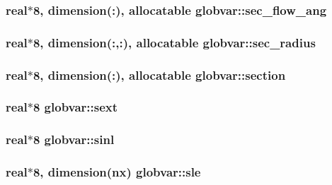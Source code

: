 \subsubsection[{sec\+\_\+flow\+\_\+ang}]{\setlength{\rightskip}{0pt plus 5cm}real$\ast$8, dimension(\+:), allocatable globvar\+::sec\+\_\+flow\+\_\+ang}\label{namespaceglobvar_a208ad9b136524be1d4393b67f071b5eb}
\hypertarget{namespaceglobvar_aca37141a129c261c28872a486944fece}{}
\subsubsection[{sec\+\_\+radius}]{\setlength{\rightskip}{0pt plus 5cm}real$\ast$8, dimension(\+:,\+:), allocatable globvar\+::sec\+\_\+radius}\label{namespaceglobvar_aca37141a129c261c28872a486944fece}
\hypertarget{namespaceglobvar_a7ae731b4717928e79d30248e180567de}{}
\subsubsection[{section}]{\setlength{\rightskip}{0pt plus 5cm}real$\ast$8, dimension(\+:), allocatable globvar\+::section}\label{namespaceglobvar_a7ae731b4717928e79d30248e180567de}
\hypertarget{namespaceglobvar_a8773a7a4d47bf7edb84938ff38c3e302}{}
\subsubsection[{sext}]{\setlength{\rightskip}{0pt plus 5cm}real$\ast$8 globvar\+::sext}\label{namespaceglobvar_a8773a7a4d47bf7edb84938ff38c3e302}
\hypertarget{namespaceglobvar_a9ed7026c367a81340ec32f8feac5d8b9}{}
\subsubsection[{sinl}]{\setlength{\rightskip}{0pt plus 5cm}real$\ast$8 globvar\+::sinl}\label{namespaceglobvar_a9ed7026c367a81340ec32f8feac5d8b9}
\hypertarget{namespaceglobvar_a347bdab2ae7c615cda2ac9b23ac6f511}{}
\subsubsection[{sle}]{\setlength{\rightskip}{0pt plus 5cm}real$\ast$8, dimension({\bf nx}) globvar\+::sle}\label{namespaceglobvar_a347bdab2ae7c615cda2ac9b23ac6f511}
\hypertarget{namespaceglobvar_a01ec65d098c5cf6f7396ff80126eb25e}{}
